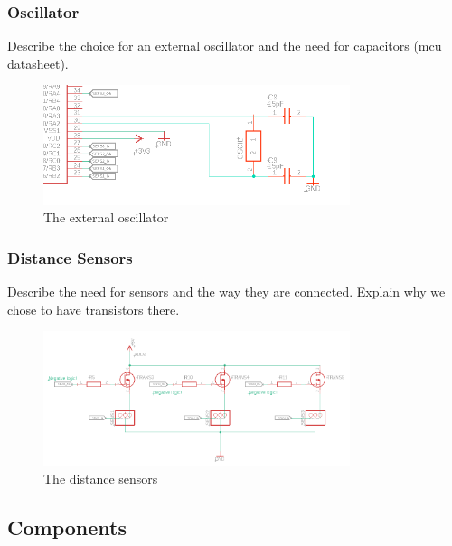 \FloatBarrier


\subsubsection{Oscillator}

Describe the choice for an external oscillator and the need for capacitors (mcu datasheet).

\begin{figure}[htb]
    \centering
    \includegraphics[width=0.8\textwidth]{figures/hardware/Oscillator.PNG}
    \caption{The external oscillator}
    \label{fig:oscillator}
\end{figure}

\FloatBarrier


\subsubsection{Distance Sensors}

Describe the need for sensors and the way they are connected.
Explain why we chose to have transistors there.

\begin{figure}[htb]
    \centering
    \includegraphics[width=0.8\textwidth]{figures/hardware/DistanceSensors.PNG}
    \caption{The distance sensors}
    \label{fig:sensors}
\end{figure}

\FloatBarrier



\subsection{Components}

